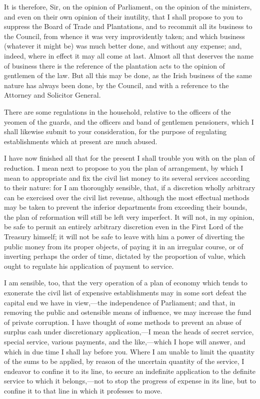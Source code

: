 It is therefore, Sir, on the opinion of Parliament, on the opinion of the ministers, and even on their own opinion of their inutility, that I shall propose to you to suppress the Board of Trade and Plantations, and to recommit all its business to the Council, from whence it was very improvidently taken; and which business (whatever it might be) was much better done, and without any expense; and, indeed, where in effect it may all come at last. Almost all that deserves the name of business there is the reference of the plantation acts to the opinion of gentlemen of the law. But all this may be done, as the Irish business of the same nature has always been done, by the Council, and with a reference to the Attorney and Solicitor General.

There are some regulations in the household, relative to the officers of the yeomen of the guards, and the officers and band of gentlemen pensioners, which I shall likewise submit to your consideration, for the purpose of regulating establishments which at present are much abused.

I have now finished all that for the present I shall trouble you with on the plan of reduction. I mean next to propose to you the plan of arrangement, by which I mean to appropriate and fix the civil list money to its several services according to their nature: for I am thoroughly sensible, that, if a discretion wholly arbitrary can be exercised over the civil list revenue, although the most effectual methods may be taken to prevent the inferior departments from exceeding their bounds, the plan of reformation will still be left very imperfect. It will not, in my opinion, be safe to permit an entirely arbitrary discretion even in the First Lord of the Treasury himself; it will not be safe to leave with him a power of diverting the public money from its proper objects, of paying it in an irregular course, or of inverting perhaps the order of time, dictated by the proportion of value, which ought to regulate his application of payment to service.

I am sensible, too, that the very operation of a plan of economy which tends to exonerate the civil list of expensive establishments may in some sort defeat the capital end we have in view,—the independence of Parliament; and that, in removing the public and ostensible means of influence, we may increase the fund of private corruption. I have thought of some methods to prevent an abuse of surplus cash under discretionary application,—I mean the heads of secret service, special service, various payments, and the like,—which I hope will answer, and which in due time I shall lay before you. Where I am unable to limit the quantity of the sums to be applied, by reason of the uncertain quantity of the service, I endeavor to confine it to its line, to secure an indefinite application to the definite service to which it belongs,—not to stop the progress of expense in its line, but to confine it to that line in which it professes to move.

